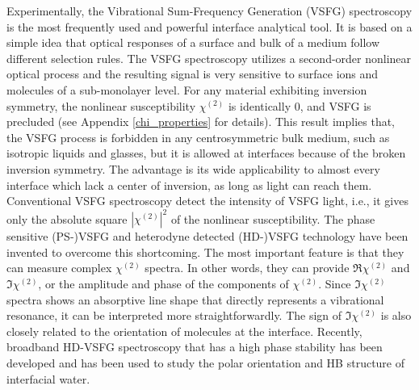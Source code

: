 Experimentally, the Vibrational Sum-Frequency Generation (VSFG) spectroscopy is the most frequently used and powerful interface analytical tool\cite{Shen2016,Morita2018,Shen2020}.
It is based on a simple idea that optical responses of a surface and bulk of a medium follow different selection rules.
The VSFG spectroscopy utilizes a second-order nonlinear optical process and the resulting signal is very sensitive to surface ions and 
molecules of a sub-monolayer level\cite{Morita2008,WangHongFei2015,WenYuChieh2016,Ishiyama2017,Penalber-Johnstone2018}. 
%
For any material exhibiting inversion symmetry, the nonlinear susceptibility $\chi^{(2)}$ is identically 0, and VSFG is precluded\cite{Franken1963} (see Appendix \ref{chi_properties} for details).
This result implies that, the VSFG process is forbidden in any centrosymmetric bulk medium\cite{CheM2012},
such as isotropic liquids and glasses, but it is allowed at interfaces because of the broken inversion symmetry\cite{PF00}.
The advantage is its wide applicability to almost every interface which lack a center of inversion, as long as light can reach them. 
%
Conventional VSFG spectroscopy detect the intensity of VSFG light,
i.e., it gives only the absolute square $|\chi^{(2)}|^2$ of the nonlinear susceptibility\cite{ShenYR1984,Guyot-Sionnest1986,Shen2020}. 
The phase sensitive (PS-)VSFG\cite{JiN2008} and heterodyne detected (HD-)VSFG technology have been invented to overcome this shortcoming. 
The most important feature is that they can measure complex $\chi^{(2)}$ spectra. 
In other words, they can provide $\Re \chi^{(2)}$ and $\Im \chi^{(2)}$, or the amplitude and phase of the components of $\chi^{(2)}$. 
Since $\Im \chi^{(2)}$ spectra shows an absorptive line shape that directly represents a vibrational resonance, 
it can be interpreted more straightforwardly\cite{Nihonyanagi2013}.
The sign of $\Im \chi^{(2)}$ is also closely related to the orientation of molecules at the interface\cite{TianCS2008,TianCS2009,TianCS2011}.
Recently, broadband HD-VSFG spectroscopy that has a high phase stability has been developed and has been used to study the polar orientation and HB structure of interfacial
water\cite{Nihonyanagi2009,Shen2013}. 

